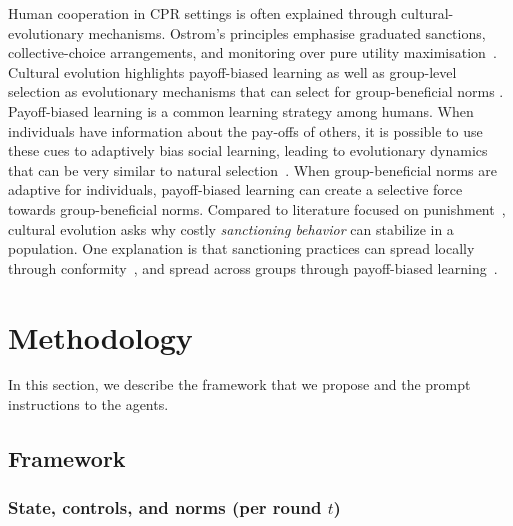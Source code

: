 \documentclass[sigconf]{aamas}
\begin{document}
Human cooperation in CPR settings is often explained through cultural-evolutionary mechanisms. 
Ostrom’s principles emphasise graduated sanctions, collective-choice arrangements, and monitoring over pure utility maximisation~\cite{ostrom1999design,ostrom2009general}. 
Cultural evolution highlights payoff-biased learning as well as group-level selection as evolutionary mechanisms that can select for group-beneficial norms \cite{boyd2002group,smith2020cultural}. 
Payoff-biased learning is a common learning strategy among humans. 
When individuals have information about the pay-offs of others, it is possible to use these cues to adaptively bias social learning, leading to evolutionary dynamics that can be very similar to natural selection~\cite{mcelreath2008beyond}. 
When group-beneficial norms are adaptive for individuals, payoff-biased learning can create a selective force towards group-beneficial norms.  
Compared to literature focused on punishment~\cite{piedrahita2025corrupted}, cultural evolution asks why costly \emph{sanctioning behavior} can stabilize in a population. 
One explanation is that sanctioning practices can spread locally through conformity~\cite{henrich2001evolution}, and spread across groups through payoff-biased learning~\cite{boyd2002group}. 

\section{Methodology}

In this section, we describe the framework that we propose and the prompt instructions to the agents. 

\subsection{Framework}

\subsubsection{\textbf{State, controls, and norms (per round $t$)}}
\end{document}
